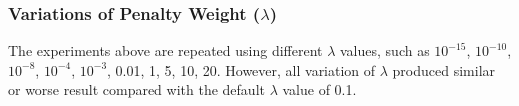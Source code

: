 \subsubsection{Variations of Penalty Weight ($\lambda$)}
The experiments above are repeated using different $\lambda$ values, such as $10^{-15}$, $10^{-10}$, $10^{-8}$, $10^{-4}$, $10^{-3}$, 0.01, 1, 5, 10, 20.
However, all variation of $\lambda$ produced similar or worse result compared with the default $\lambda$ value of 0.1.
